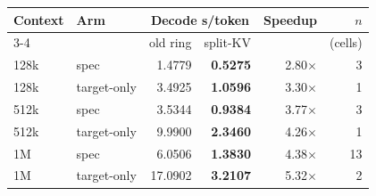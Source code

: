 \begin{tabular}{llrrrr}
\toprule
Context & Arm & \multicolumn{2}{c}{Decode s/token} & Speedup & $n$ \\
\cmidrule(lr){3-4}
 & & old ring & split-KV & & (cells) \\
\midrule
128k & spec & 1.4779 & \textbf{0.5275} & 2.80$\times$ & 3 \\
128k & target-only & 3.4925 & \textbf{1.0596} & 3.30$\times$ & 1 \\
512k & spec & 3.5344 & \textbf{0.9384} & 3.77$\times$ & 3 \\
512k & target-only & 9.9900 & \textbf{2.3460} & 4.26$\times$ & 1 \\
1M & spec & 6.0506 & \textbf{1.3830} & 4.38$\times$ & 13 \\
1M & target-only & 17.0902 & \textbf{3.2107} & 5.32$\times$ & 2 \\
\bottomrule
\end{tabular}
